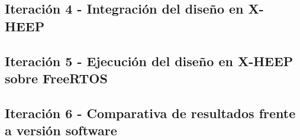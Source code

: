 \subsection{Iteración 4 - Integración del diseño en X-HEEP}

\subsection{Iteración 5 - Ejecución del diseño en X-HEEP sobre FreeRTOS}

\subsection{Iteración 6 - Comparativa de resultados frente a versión software}